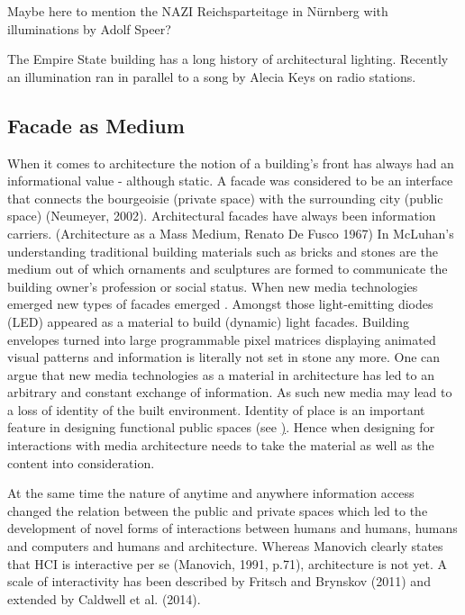 Maybe here to mention the NAZI Reichsparteitage in Nürnberg with illuminations by Adolf Speer?

The Empire State building has a long history of architectural lighting.
Recently an illumination ran in parallel to a song by Alecia Keys on radio stations.



\subsection{Facade as Medium}

When it comes to architecture the notion of a building's front has always had an informational value - although static. A facade was considered to be an interface that connects the bourgeoisie (private space) with the surrounding city (public space) (Neumeyer, 2002). Architectural facades  have always been information carriers. (Architecture as a Mass Medium,  Renato De Fusco 1967)
In McLuhan's understanding traditional building materials such as bricks and stones are the medium out of which ornaments and sculptures are formed to communicate the building owner's profession or social status. 
When new media technologies emerged new types of facades emerged \cite{Haeusler2009}. Amongst those light-emitting diodes (LED) appeared as a material to build (dynamic) light facades. 
Building envelopes turned into large programmable pixel matrices displaying animated visual patterns and information is literally not set in stone any more. 
One can argue that new media technologies as a material in architecture has led to an arbitrary and constant exchange of information. As such new media may lead to a loss of identity of the built environment. Identity of place is an important feature in designing functional public spaces (see \href{placemaking}). Hence when designing for interactions with media architecture needs to take the material as well as the content into consideration.

At the same time the nature of anytime and anywhere information access changed the relation between the public and private spaces which led to the development of novel forms of interactions between humans and humans, humans and computers and humans and architecture. Whereas Manovich clearly states that HCI is interactive per se (Manovich, 1991, p.71), architecture is not yet. 
A scale of interactivity has been described by Fritsch and Brynskov (2011) and extended by Caldwell et al. (2014).

